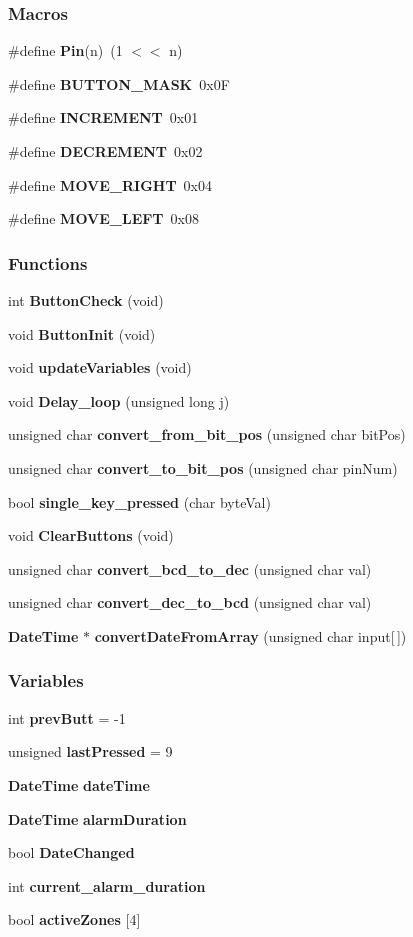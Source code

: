\subsubsection*{Macros}
\begin{DoxyCompactItemize}
\item 
\#define \textbf{ Pin}(n)~(1 $<$$<$ n)
\item 
\#define \textbf{ B\+U\+T\+T\+O\+N\+\_\+\+M\+A\+SK}~0x0F
\item 
\#define \textbf{ I\+N\+C\+R\+E\+M\+E\+NT}~0x01
\item 
\#define \textbf{ D\+E\+C\+R\+E\+M\+E\+NT}~0x02
\item 
\#define \textbf{ M\+O\+V\+E\+\_\+\+R\+I\+G\+HT}~0x04
\item 
\#define \textbf{ M\+O\+V\+E\+\_\+\+L\+E\+FT}~0x08
\end{DoxyCompactItemize}
\subsubsection*{Functions}
\begin{DoxyCompactItemize}
\item 
int \textbf{ Button\+Check} (void)
\item 
void \textbf{ Button\+Init} (void)
\item 
void \textbf{ update\+Variables} (void)
\item 
void \textbf{ Delay\+\_\+loop} (unsigned long j)
\item 
unsigned char \textbf{ convert\+\_\+from\+\_\+bit\+\_\+pos} (unsigned char bit\+Pos)
\item 
unsigned char \textbf{ convert\+\_\+to\+\_\+bit\+\_\+pos} (unsigned char pin\+Num)
\item 
bool \textbf{ single\+\_\+key\+\_\+pressed} (char byte\+Val)
\item 
void \textbf{ Clear\+Buttons} (void)
\item 
unsigned char \textbf{ convert\+\_\+bcd\+\_\+to\+\_\+dec} (unsigned char val)
\item 
unsigned char \textbf{ convert\+\_\+dec\+\_\+to\+\_\+bcd} (unsigned char val)
\item 
\textbf{ Date\+Time} $\ast$ \textbf{ convert\+Date\+From\+Array} (unsigned char input[$\,$])
\end{DoxyCompactItemize}
\subsubsection*{Variables}
\begin{DoxyCompactItemize}
\item 
int \textbf{ prev\+Butt} = -\/1
\item 
unsigned \textbf{ last\+Pressed} = 9
\item 
\textbf{ Date\+Time} \textbf{ date\+Time}
\item 
\textbf{ Date\+Time} \textbf{ alarm\+Duration}
\item 
bool \textbf{ Date\+Changed}
\item 
int \textbf{ current\+\_\+alarm\+\_\+duration}
\item 
bool \textbf{ active\+Zones} [4]
\end{DoxyCompactItemize}


